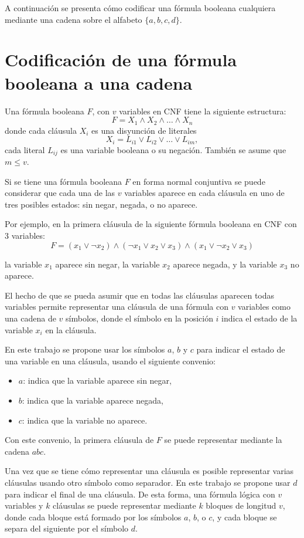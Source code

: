 A continuación se presenta cómo codificar una fórmula booleana cualquiera mediante una cadena sobre el alfabeto $\{a,b,c,d\}$.

\section{Codificación de una fórmula booleana a una cadena}
\label{sec:codsat}

Una fórmula booleana $F$, con $v$ variables en CNF tiene la siguiente estructura:
$$F=X_1 \wedge X_2 \wedge \ldots \wedge X_n$$
donde cada cláusula $X_i$ es una disyunción de literales
$$X_i=L_{i1} \vee L_{i2} \vee \ldots \vee L_{im},$$
cada literal $L_{ij}$ es una variable booleana o su negación. También se asume que $m\leq v$. 

Si se tiene una fórmula booleana $F$ en forma normal conjuntiva se puede considerar que cada una de las $v$ variables aparece en cada cláusula en uno de tres posibles estados: sin negar, negada, o no aparece.

Por ejemplo, en la primera cláusula de la siguiente fórmula booleana en CNF con 3 variables:
$$F=(x_1 \vee \neg x_2) \wedge (\neg x_1 \vee x_2 \vee x_3) \wedge (x_1 \vee \neg x_2 \vee x_3)$$

la variable $x_1$ aparece sin negar, la variable $x_2$ aparece negada, y la variable $x_{3}$ no aparece.

El hecho de que se pueda asumir que en todas las cláusulas aparecen todas variables permite representar una cláusula de una fórmula con $v$ variables como una cadena de $v$ símbolos, donde el símbolo en la posición $i$ indica el estado de la variable $x_i$ en la cláusula.

En este trabajo se propone usar los símbolos $a$, $b$ y $c$ para indicar el estado de una variable en una cláusula, usando el siguiente convenio:

\begin{itemize}
    \item $a$: indica que la variable aparece sin negar,
    \item $b$: indica que la variable aparece negada,
    \item $c$: indica que la variable no aparece.
\end{itemize}

Con este convenio, la primera cláusula de $F$ se puede representar mediante la cadena $abc$.

Una vez que se tiene cómo representar una cláusula es posible representar varias cláusulas usando otro símbolo como separador.
En este trabajo se propone usar $d$ para indicar el final de una cláusula. De esta forma, una fórmula lógica con $v$ variables y $k$ cláusulas se puede representar mediante $k$ bloques de longitud $v$, donde cada bloque está formado por los símbolos $a$, $b$, o $c$, y cada bloque se separa del siguiente por el símbolo $d$.


